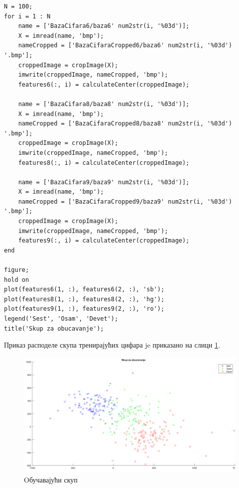 \begin{lstlisting}[caption={Обрада цифара},label={piece:train}]
N = 100;
for i = 1 : N
    name = ['BazaCifara6/baza6' num2str(i, '%03d')];
    X = imread(name, 'bmp');    
    nameCropped = ['BazaCifaraCropped6/baza6' num2str(i, '%03d') '.bmp'];
    croppedImage = cropImage(X);
    imwrite(croppedImage, nameCropped, 'bmp');
    features6(:, i) = calculateCenter(croppedImage);
    
    name = ['BazaCifara8/baza8' num2str(i, '%03d')];
    X = imread(name, 'bmp');  
    nameCropped = ['BazaCifaraCropped8/baza8' num2str(i, '%03d') '.bmp'];
    croppedImage = cropImage(X);
    imwrite(croppedImage, nameCropped, 'bmp');
    features8(:, i) = calculateCenter(croppedImage);
    
    name = ['BazaCifara9/baza9' num2str(i, '%03d')];
    X = imread(name, 'bmp');  
    nameCropped = ['BazaCifaraCropped9/baza9' num2str(i, '%03d') '.bmp'];
    croppedImage = cropImage(X);
    imwrite(croppedImage, nameCropped, 'bmp');
    features9(:, i) = calculateCenter(croppedImage);
end

figure;
hold on
plot(features6(1, :), features6(2, :), 'sb');
plot(features8(1, :), features8(2, :), 'hg');
plot(features9(1, :), features9(2, :), 'ro');
legend('Sest', 'Osam', 'Devet');
title('Skup za obucavanje');
\end{lstlisting}

Приказ расподеле скупа тренирајућих цифара je приказано на слици \ref{fig:Train}.

\begin{figure}[htb!]

\includegraphics[scale=.42]{pictures/1/TrainSet}
\caption{Oбучавајући скуп}\label{fig:Train}
\end{figure}



